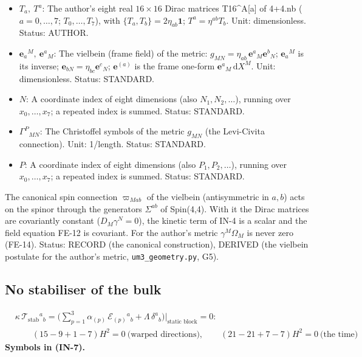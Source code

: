 \documentclass[
  10pt,
]{article}
\begin{document}
\begin{itemize}
  \(\Sigma^{ab},\ \Sigma^{\mu\nu}\): The generators of Spin(4,4) on
  dirac16complex, \(\Sigma^{ab} = \frac14[T^a, T^b]\) (the scaled
  commutators of the author's matrices);
  \(\Sigma^{\mu\nu} = \mathbf{e}_a{}^\mu\mathbf{e}_b{}^\nu\Sigma^{ab}\)
  along the fold. Unit: dimensionless. Status: AUTHOR.
\item
  \(T_a,\ T^a\): The author's eight real \(16 \times 16\) Dirac matrices
  T16\^{}A{[}a{]} of 4+4.nb (\(a = 0, \dots, 7\); \(T_0, \dots, T_7\)),
  with \(\{T_a, T_b\} = 2\eta_{ab}\mathbf{1}\); \(T^a = \eta^{ab}T_b\).
  Unit: dimensionless. Status: AUTHOR.
\item
  \(\mathbf{e}_a{}^M,\ \mathbf{e}^a{}_M\): The vielbein (frame field) of
  the metric: \(g_{MN} = \eta_{ab}\,\mathbf{e}^a{}_M\mathbf{e}^b{}_N\);
  \(\mathbf{e}_a{}^M\) is its inverse;
  \(\mathbf{e}_{bN} = \eta_{bc}\mathbf{e}^c{}_N\); \(\mathbf{e}^{(a)}\)
  is the frame one-form \(\mathbf{e}^a{}_M\,\mathrm{d}X^M\). Unit:
  dimensionless. Status: STANDARD.
\item
  \(N\): A coordinate index of eight dimensions (also
  \(N_1, N_2, \dots\)), running over \(x_0, \dots, x_7\); a repeated
  index is summed. Status: STANDARD.
\item
  \(\Gamma^P{}_{MN}\): The Christoffel symbols of the metric \(g_{MN}\)
  (the Levi-Civita connection). Unit: 1/length. Status: STANDARD.
\item
  \(P\): A coordinate index of eight dimensions (also
  \(P_1, P_2, \dots\)), running over \(x_0, \dots, x_7\); a repeated
  index is summed. Status: STANDARD.
\end{itemize}

The canonical spin connection \(\varpi_{Mab}\) of the vielbein
(antisymmetric in \(a, b\)) acts on the spinor through the generators
\(\Sigma^{ab}\) of Spin(4,4). With it the Dirac matrices are covariantly
constant (\(D_M\gamma^N = 0\)), the kinetic term of IN-4 is a scalar and
the field equation FE-12 is covariant. For the author's metric
\(\gamma^M\Omega_M\) is never zero (FE-14). Status: RECORD (the
canonical construction), DERIVED (the vielbein postulate for the
author's metric, \texttt{um3\_geometry.py}, G5).

\hypertarget{no-stabiliser-of-the-bulk}{%
\subsection{No stabiliser of the bulk}\label{no-stabiliser-of-the-bulk}}

\[
\begin{aligned}
&\kappa\,\mathcal{T}_{\mathrm{stab}}{}^a{}_b = \Big(\sum_{p=1}^{3}\alpha_{(p)}\,\mathcal{E}_{(p)}{}^a{}_b + \Lambda\,\delta^a{}_b\Big)\Big\vert_{\text{static block}} = 0:\\
&\qquad (15 - 9 + 1 - 7)H^2 = 0\ \text{(warped directions)},\qquad (21 - 21 + 7 - 7)H^2 = 0\ \text{(the time)}
\end{aligned} \tag{IN-7}
\] \textbf{Symbols in (IN-7).}
\end{document}
